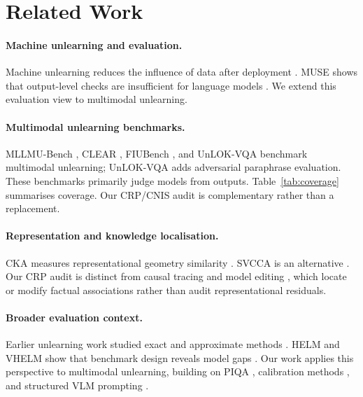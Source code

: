 \documentclass[letterpaper]{article}
\begin{document}
\section{Related Work}

\paragraph{Machine unlearning and evaluation.}
Machine unlearning reduces the influence of data after deployment
\citep{bourtoule2021machine}. MUSE shows that output-level checks are
insufficient for language models \citep{shi2024muse}. We extend this
evaluation view to multimodal unlearning.

\paragraph{Multimodal unlearning benchmarks.}
MLLMU-Bench \citep{liu2024mllmu}, CLEAR \citep{dontsov2024clear}, FIUBench
\citep{ma2024fiubench}, and UnLOK-VQA \citep{patil2025unlok} benchmark
multimodal unlearning; UnLOK-VQA adds adversarial paraphrase evaluation. These
benchmarks primarily judge models from outputs. Table~\ref{tab:coverage}
summarises coverage. Our CRP/CNIS audit is complementary rather than a
replacement.

\paragraph{Representation and knowledge localisation.}
CKA measures representational geometry similarity
\citep{kornblith2019cka,nguyen2021dkcka}. SVCCA is an alternative
\citep{raghu2017svcca}. Our CRP audit is distinct from causal tracing
\citep{meng2022rome,meng2023memit} and model editing \citep{mitchell2022serac},
which locate or modify factual associations rather than audit
representational residuals.

\paragraph{Broader evaluation context.}
Earlier unlearning work studied exact and approximate methods
\citep{cao2015towards,guo2020certified,golatkar2020eternal,wu2020deltagrad}.
HELM and VHELM show that benchmark design reveals model gaps
\citep{liang2023helm,lee2024vhelm}. Our work applies this perspective to
multimodal unlearning, building on PIQA \citep{bisk2020piqa}, calibration
methods \citep{lyu2025calibrating}, and structured VLM prompting
\citep{wang2024hpt}.
\end{document}
